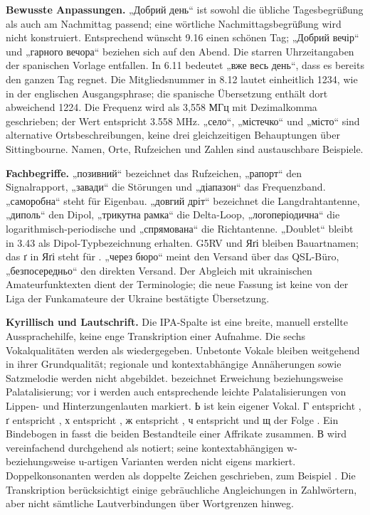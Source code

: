 \documentclass[a4paper,landscape,10pt]{article}
\newcommand{\ipa}[1]{{\ipafont[#1]}}
\begin{document}
\medskip
\textbf{Bewusste Anpassungen.} „Добрий день“ ist sowohl die übliche Tagesbegrüßung als auch
am Nachmittag passend; eine wörtliche Nachmittagsbegrüßung wird nicht konstruiert.
Entsprechend wünscht 9.16 einen schönen Tag; „Добрий вечір“ und „гарного вечора“ beziehen sich auf den Abend.
Die starren Uhrzeitangaben der spanischen Vorlage entfallen. In 6.11 bedeutet „вже весь день“,
dass es bereits den ganzen Tag regnet. Die Mitgliedsnummer in 8.12 lautet einheitlich 1234,
wie in der englischen Ausgangsphrase; die spanische Übersetzung enthält dort abweichend 1224.
Die Frequenz wird als 3,558 МГц mit Dezimalkomma geschrieben; der Wert entspricht 3.558 MHz.
„село“, „містечко“ und „місто“ sind alternative Ortsbeschreibungen, keine drei gleichzeitigen
Behauptungen über Sittingbourne. Namen, Orte, Rufzeichen und Zahlen sind austauschbare Beispiele.

\medskip
\textbf{Fachbegriffe.} „позивний“ bezeichnet das Rufzeichen, „рапорт“ den Signalrapport,
„завади“ die Störungen und „діапазон“ das Frequenzband. „саморобна“ steht für Eigenbau.
„довгий дріт“ bezeichnet die Langdrahtantenne, „диполь“ den Dipol, „трикутна рамка“ die Delta-Loop,
„логоперіодична“ die logarithmisch-periodische und „спрямована“ die Richtantenne.
„Doublet“ bleibt in 3.43 als Dipol-Typbezeichnung erhalten. G5RV und Яґі bleiben Bauartnamen;
das ґ in Яґі steht für \ipa{ɡ}. „через бюро“ meint den Versand über das QSL-Büro,
„безпосередньо“ den direkten Versand. Der Abgleich mit ukrainischen Amateurfunktexten dient der
Terminologie; die neue Fassung ist keine von der Liga der Funkamateure der Ukraine bestätigte Übersetzung.

\medskip
\textbf{Kyrillisch und Lautschrift.} Die IPA-Spalte ist eine breite, manuell erstellte Aussprachehilfe,
keine enge Transkription einer Aufnahme. Die sechs Vokalqualitäten werden als \ipa{i, ɪ, ɛ, a, ɔ, u}
wiedergegeben. Unbetonte Vokale bleiben weitgehend in ihrer Grundqualität; regionale und
kontextabhängige Annäherungen sowie Satzmelodie werden nicht abgebildet.
\ipa{ʲ} bezeichnet Erweichung beziehungsweise Palatalisierung; vor і werden auch entsprechende
leichte Palatalisierungen von Lippen- und Hinterzungenlauten markiert. Ь ist kein eigener Vokal.
Г entspricht \ipa{ɦ}, ґ entspricht \ipa{ɡ}, х entspricht \ipa{x}, ж entspricht \ipa{ʒ},
ч entspricht \ipa{tʃ} und щ der Folge \ipa{ʃtʃ}. Ein Bindebogen in \ipa{t͡s, d͡z}
fasst die beiden Bestandteile einer Affrikate zusammen. В wird vereinfachend durchgehend als \ipa{ʋ}
notiert; seine kontextabhängigen w- beziehungsweise u-artigen Varianten werden nicht eigens markiert.
Doppelkonsonanten werden als doppelte Zeichen geschrieben, zum Beispiel \ipa{nnʲ}.
Die Transkription berücksichtigt einige gebräuchliche Angleichungen in Zahlwörtern,
aber nicht sämtliche Lautverbindungen über Wortgrenzen hinweg.
\end{document}
